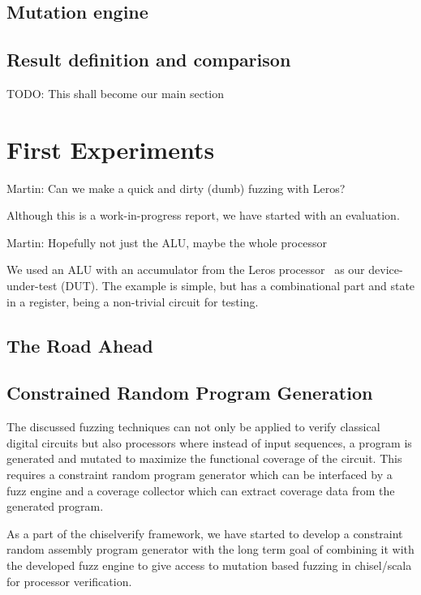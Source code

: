 \documentclass[conference]{IEEEtran}
\newcommand{\todo}[1]{{\color{olive} TODO: #1}}
\newcommand{\martin}[1]{{\color{blue} Martin: #1}}
\begin{document}
\subsection{Mutation engine}

\subsection{Result definition and comparison}

\todo{This shall become our main section}

\section{First Experiments}
\label{sec:eval}

\martin{Can we make a quick and dirty (dumb) fuzzing with Leros?}

Although this is a work-in-progress report, we have started with an evaluation.

\martin{Hopefully not just the ALU, maybe the whole processor}

We used an ALU with an accumulator from the Leros processor~\cite{leros:arcs2019}
as our device-under-test (DUT).
The example is simple, but has a combinational part and state in a register, being
a non-trivial circuit for testing.







\subsection{The Road Ahead}

\subsection{Constrained Random Program Generation}

The discussed fuzzing techniques can not only be applied to verify classical digital circuits but also processors where instead of input sequences, a program is generated and mutated to maximize the functional coverage of the circuit. This requires a constraint random program generator which can be interfaced by a fuzz engine and a coverage collector which can extract coverage data from the generated program. 

As a part of the chiselverify framework, we have started to develop a constraint random assembly program generator with the long term goal of combining it with the developed fuzz engine to give access to mutation based fuzzing in chisel/scala for processor verification.
\end{document}
